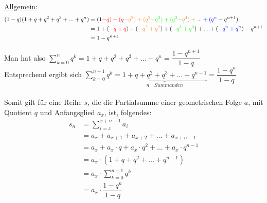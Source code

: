 \documentclass[../MAIN/main.tex]{subfiles}
\begin{document}
\begin{Beweis}
\underline{Allgemein:}
\begin{align*}
(1-q)(1+q+q^2+q^3+...+q^n)&=(1\textcolor{red}{-q)+(q}\textcolor{orange}{-q^2)+(q^2}\textcolor{green}{-q^3)+(q^3}\textcolor{brown}{-q^4)+.}.\textcolor{blue}{.+(q^n}-q^{n+1})\\
&=1+(\textcolor{red}{-q+q})+(\textcolor{orange}{-q^2+q^2})+(\textcolor{green}{-q^3+q^3})+...+(\textcolor{blue}{-q^n+q^n})-q^{n+1}\\
&=1-q^{n+1}\\
\end{align*}

Man hat also $\sum\limits_{k=0}^nq^k=1+q+q^2+q^3+...+q^n=\dfrac{1-q^{n+1}}{1-q}$\\
Entsprechend ergibt sich $\sum\limits_{k=0}^{n-1}q^k=\underbrace{1+q+q^2+q^3+...+q^{n-1}}_{n\quad Summanden}=\dfrac{1-q^n}{1-q}$\\
\\
Somit gilt für eine Reihe $s$, die die Partialsumme einer geometrischen Folge $a$, mit Quotient $q$ und Anfangsglied $a_{x}$, ist, folgendes:\\
\begin{align*}
s_{n}&=\sum\limits_{i=x}^{x+n-1}a_{i}\\
&=a_{x}+a_{x+1}+a_{x+2}+...+a_{x+n-1}\\
&=a_{x}+a_{x}\cdot q+a_{x}\cdot q^{2}+...+a_{x}\cdot q^{n-1}\\
&=a_{x}\cdot(1+q+q^2+...+q^{n-1})\\
&=a_{x}\cdot \sum\limits_{k=0}^{n-1}q^k\\
&=a_{x}\cdot \dfrac{1-q^{n}}{1-q}
\end{align*}
\end{Beweis}
\end{document}
